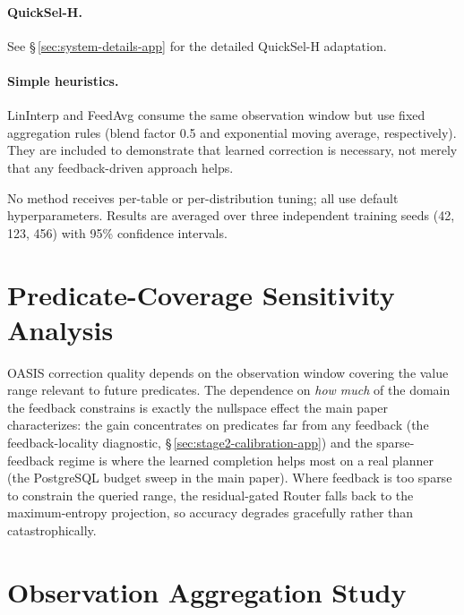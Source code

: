 \documentclass[11pt]{article}
\begin{document}
\paragraph{QuickSel-H.}
See \S\,\ref{sec:system-details-app} for the detailed QuickSel-H adaptation.

\paragraph{Simple heuristics.}
LinInterp and FeedAvg consume the same observation window but use fixed
aggregation rules (blend factor 0.5 and exponential moving average,
respectively). They are included to demonstrate that learned correction is
necessary, not merely that any feedback-driven approach helps.

No method receives per-table or per-distribution tuning; all use default
hyperparameters. Results are averaged over three independent training seeds
(42, 123, 456) with 95\% confidence intervals.



\section{Predicate-Coverage Sensitivity Analysis}
\label{sec:coverage-sensitivity-app}

OASIS correction quality depends on the observation window covering the value range
relevant to future predicates. The dependence on \emph{how much} of the domain the
feedback constrains is exactly the nullspace effect the main paper characterizes: the
gain concentrates on predicates far from any feedback (the feedback-locality diagnostic,
\S\,\ref{sec:stage2-calibration-app}) and the sparse-feedback regime is where the learned
completion helps most on a real planner (the PostgreSQL budget sweep in the main paper).
Where feedback is too sparse to constrain the queried range, the residual-gated Router
falls back to the maximum-entropy projection, so accuracy degrades gracefully rather than
catastrophically.

\section{Observation Aggregation Study}
\label{sec:aggregation-app}
\end{document}
